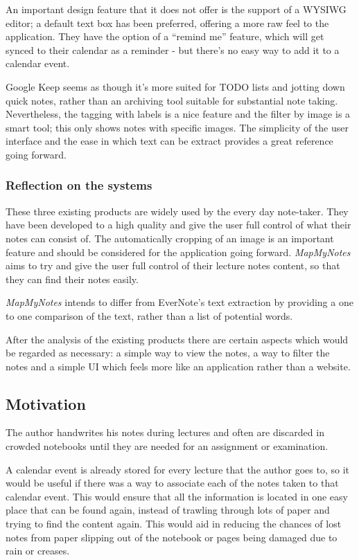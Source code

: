 An important design feature that it does not offer is the support of a WYSIWG editor; a default text box has been preferred, offering a more raw feel to the application. They have the option of a ``remind me'' feature, which will get synced to their calendar as a reminder - but there's no easy way to add it to a calendar event.

Google Keep seems as though it's more suited for TODO lists and jotting down quick notes, rather than an archiving tool suitable for substantial note taking. Nevertheless, the tagging with labels is a nice feature and the filter by image is a smart tool; this only shows notes with specific images. The simplicity of the user interface and the ease in which text can be extract provides a great reference going forward.

\subsubsection{Reflection on the systems}
These three existing products are widely used by the every day note-taker. They have been developed to a high quality and give the user full control of what their notes can consist of. The automatically cropping of an image is an important feature and should be considered  for the application going forward. \textit{MapMyNotes} aims to try and give the user full control of their lecture notes content, so that they can find their notes easily.

\textit{MapMyNotes} intends to differ from EverNote's text extraction by providing a one to one comparison of the text, rather than a list of potential words.

After the analysis of the existing products there are certain aspects which would be regarded as necessary: a simple way to view the notes, a way to filter the notes and a simple UI which feels more like an application rather than a website.


\subsection{Motivation}
The author handwrites his notes during lectures and often are discarded in crowded notebooks until they are needed for an assignment or examination.

A calendar event is already stored for every lecture that the author goes to, so it would be useful if there was a way to associate each of the notes taken to that calendar event. This would ensure that all the information is located in one easy place that can be found again, instead of trawling through lots of paper and trying to find the content again. This would aid in reducing the chances of lost notes from paper slipping out of the notebook or pages being damaged due to rain or creases.

